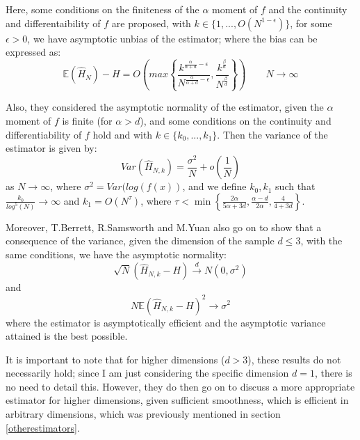 \documentclass[12pt]{report}
\begin{document}
Here, some conditions on the finiteness of the $\alpha$ moment of $f$ and the continuity and differentaibility of $f$ are proposed, with $k \in \{1, ..., O(N^{1-\epsilon})\}$, for some $\epsilon > 0$, we have asymptotic unbias of the estimator; where the bias can be expressed as:
\begin{equation}
\mathbb{E} ( \hat{H}_{N} ) - H = O \left( max \left\{ \frac{k^{\frac{\alpha}{\alpha + d} - \epsilon}}{N^{\frac{\alpha}{\alpha + d} - \epsilon}}, \frac{k^{\frac{\beta}{d}}}{N^{\frac{\beta}{d}}} \right\} \right) \quad \quad N \to \infty
\end{equation}

Also, they considered the asymptotic normality of the estimator, given the $\alpha$ moment of $f$ is finite (for $\alpha > d$), and some conditions on the continuity and differentiability of $f$ hold and with $k \in \{k_{0}, ..., k_{1}\}$. Then the variance of the estimator is given by:
\begin{equation}
Var(\hat{H}_{N, k}) = \frac{\sigma^2}{N} + o(\frac{1}{N})
\end{equation}
as $N \to \infty$, where $\sigma^2 = Var(log(f(x))$, and we define $k_{0}, k_{1}$ such that $\frac{k_{0}}{log^5(N)} \to \infty$ and $k_{1} = O(N^{\tau})$, where $\tau < \min \left\{ \frac{2 \alpha}{5 \alpha + 3d} , \frac{\alpha - d}{2 \alpha} , \frac{4}{4 + 3d} \right\}$. 

Moreover, T.Berrett, R.Samsworth and M.Yuan \cite{paper4} also go on to show that a consequence of the variance, given the dimension of the sample $d \leq 3$, with the same conditions, we have the asymptotic normality:
\begin{equation}
\sqrt{N}(\hat{H}_{N, k} - H) \xrightarrow{d} N(0, \sigma^2)
\end{equation}
and 
\begin{equation} 
N \mathbb{E}{(\hat{H}_{N, k} - H)^2} \xrightarrow{} \sigma^2
\end{equation}
where the estimator is asymptotically efficient and the asymptotic variance attained is the best possible.

It is important to note that for higher dimensions ($d > 3$), these results do not necessarily hold; since I am just considering the specific dimension $d=1$, there is no need to detail this. However, they do then go on to discuss a more appropriate estimator for higher dimensions, given sufficient smoothness, which is efficient in arbitrary dimensions, which was previously mentioned in section \ref{otherestimators}.
\end{document}
